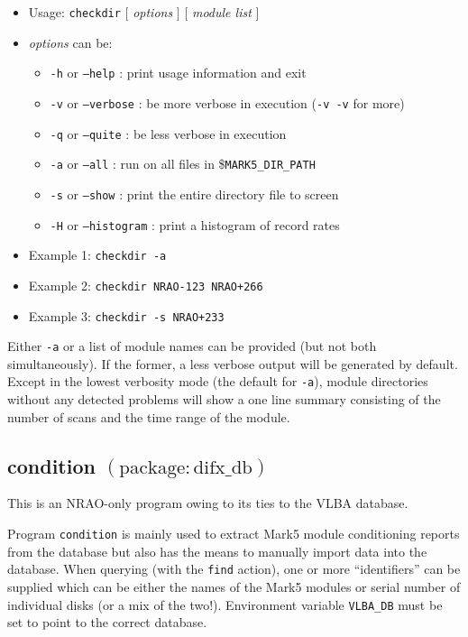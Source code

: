 \begin{itemize}
\item[] Usage: {\tt checkdir} $[$ {\em options} $]$ $[$ {\em module list} $]$
\item[] {\em options} can be:
\begin{itemize}
\item[] {\tt -h} or {\tt --help} : print usage information and exit
\item[] {\tt -v} or {\tt --verbose} : be more verbose in execution ({\tt -v -v} for more)
\item[] {\tt -q} or {\tt --quite} : be less verbose in execution
\item[] {\tt -a} or {\tt --all} : run on all files in \${\tt MARK5\_DIR\_PATH} 
\item[] {\tt -s} or {\tt --show} : print the entire directory file to screen
\item[] {\tt -H} or {\tt --histogram} : print a histogram of record rates
\end{itemize}
\item[] Example 1: {\tt checkdir -a}
\item[] Example 2: {\tt checkdir NRAO-123 NRAO+266}
\item[] Example 3: {\tt checkdir -s NRAO+233}
\end{itemize}

Either {\tt -a} or a list of module names can be provided (but not both simultaneously).
If the former, a less verbose output will be generated by default.
Except in the lowest verbosity mode (the default for {\tt -a}), module directories without any detected problems will show a one line summary consisting of the number of scans and the time range of the module.








\subsection{condition {\small $\mathrm{(package: difx\_db)}$}}

This is an NRAO-only program owing to its ties to the VLBA database.

Program {\tt condition} is mainly used to extract Mark5 module conditioning reports from the database but also has the means to manually import data into the database.
When querying (with the {\tt find} action), one or more ``identifiers'' can be supplied which can be either the names of the Mark5 modules or serial number of individual disks (or a mix of the two!).
Environment variable {\tt VLBA\_DB} must be set to point to the correct database.

